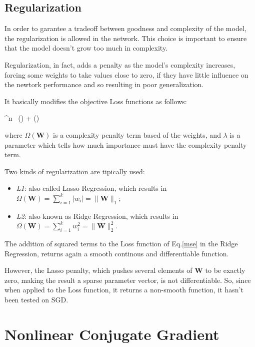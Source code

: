 		\subsection{Regularization}
		\label{sec:regularization}

			In order to garantee a tradeoff between goodness and complexity of the model, the regularization is allowed in the network. This choice is important to ensure that the model doesn't grow too much in complexity.

			Regularization, in fact, adds a penalty as the model's complexity increases, forcing some weights to take values close to zero,  if they have little influence on the newtork performance and so resulting in poor generalization.

			It basically modifies the objective Loss functions as follows:

			\begin{mini}
				{ \in {}^n} {\ () + \lambda\Omega()}{}{}
				\label{eq:reg}
			\end{mini}
			where $\Omega(\textbf{W})$ is a complexity penalty term based of the weights, and $\lambda$ is a parameter which tells how much importance must have the complexity penalty term.

			Two kinds of regularization are tipically used:

			\begin{itemize}
				\item \textit{L1}: also called Lasso Regression, which results in $\Omega(\textbf{W}) = \sum_{i=1}^{k} |w_i| = \|\textbf{W}\|_1$;
				\item \textit{L2}: also known as Ridge Regression, which results in $\Omega(\textbf{W}) = \sum_{i=1}^{k}w_i^2 = \|\textbf{W}\|_2^2$.
			\end{itemize}

			The addition of squared terms to the Loss function of Eq.\ref{mse} in the Ridge Regression, returns again a smooth continous and differentiable function. %

			However, the Lasso penalty, which pushes several elements of \textbf{W} to be exactly zero, making the result a sparse parameter vector, is not differentiable. So, since when applied to the Loss function, it returns a non-smooth function, it hasn't been tested on SGD\cite{journals/jmlr/Shalev-ShwartzT11}.

	\section{Nonlinear Conjugate Gradient}
	\label{sec:nonlinear_conjugate_gradient}

